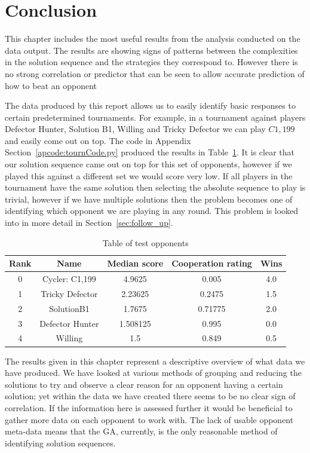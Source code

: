\section{Conclusion}\label{sec:results_conclusion}
This chapter includes the most useful results from the analysis conducted on the data output.
The results are showing signs of patterns between the complexities in the solution sequence and the strategies they correspond to.
However there is no strong correlation or predictor that can be seen to allow accurate prediction of how to beat an opponent

The data produced by this report allows us to easily identify basic responses to certain predetermined tournaments.
For example, in a tournament against players Defector Hunter, Solution B1, Willing and Tricky Defector we can play $C1,199$ and easily come out on top.
The code in Appendix Section~\ref{apcode:tournCode.py} produced the results in Table~\ref{table:table_test_opsponents}.
It is clear that our solution sequence came out on top for this set of opponents, however if we played this against a different set we would score very low.
If all players in the tournament have the same solution then selecting the absolute sequence to play is trivial, however if we have multiple solutions then the problem becomes one of identifying which opponent we are playing in any round.
This problem is looked into in more detail in Section~\ref{sec:follow_up}. 

\begin{table}
    \centering
    \begin{tabular}{ccccc}
        \toprule    
        Rank & Name & Median score & Cooperation rating & Wins \\
        \midrule
        0 & Cycler: C1,199 & 4.9625 & 0.005 & 4.0 \\ 
        1 & Tricky Defector & 2.23625 & 0.2475 & 1.5 \\ 
        2 & SolutionB1 & 1.7675 & 0.71775 & 2.0 \\ 
        3 & Defector Hunter & 1.508125 & 0.995 & 0.0 \\ 
        4 & Willing & 1.5 & 0.849 & 0.5 \\ 
        \bottomrule
    \end{tabular}
    \caption{Table of test opponents}\label{table:table_test_opsponents}
\end{table}


The results given in this chapter represent a descriptive overview of what data we have produced.
We have looked at various methods of grouping and reducing the solutions to try and observe a clear reason for an opponent having a certain solution; yet within the data we have created there seems to be no clear sign of correlation.
If the information here is assessed further it would be beneficial to gather more data on each opponent to work with. 
The lack of usable opponent meta-data means that the GA, currently, is the only reasonable method of identifying solution sequences. 
